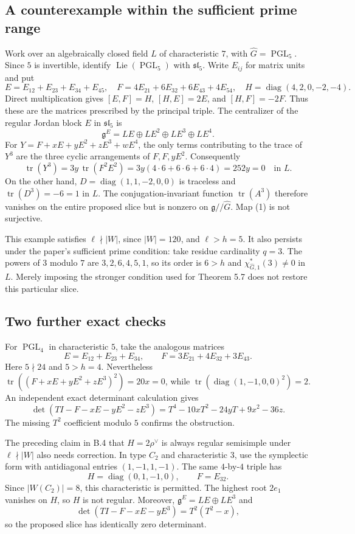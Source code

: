 \documentclass[10pt]{article}
\begin{document}
\subsection*{A counterexample within the sufficient prime range}
Work over an algebraically closed field \(L\) of characteristic \(7\), with \(\widehat G=\operatorname{PGL}_5\). Since \(5\) is invertible, identify \(\operatorname{Lie}(\operatorname{PGL}_5)\) with \(\mathfrak{sl}_5\). Write \(E_{ij}\) for matrix units and put \[E=E_{12}+E_{23}+E_{34}+E_{45},\quad
 F=4E_{21}+6E_{32}+6E_{43}+4E_{54},\quad
 H=\operatorname{diag}(4,2,0,-2,-4).\] Direct multiplication gives \([E,F]=H\), \([H,E]=2E\), and \([H,F]=-2F\). Thus these are the matrices prescribed by the principal triple. The centralizer of the regular Jordan block \(E\) in \(\mathfrak{sl}_5\) is \[\mathfrak g^E=L E\oplus L E^2\oplus L E^3\oplus L E^4 .\] For \(Y=F+xE+yE^2+zE^3+wE^4\), the only terms contributing to the trace of \(Y^3\) are the three cyclic arrangements of \(F,F,yE^2\). Consequently \[\operatorname{tr}(Y^3)=3y\,\operatorname{tr}(F^2E^2)
         =3y(4\cdot6+6\cdot6+6\cdot4)=252y=0\quad\text{in }L.       \tag{2}\] On the other hand, \(D=\operatorname{diag}(1,1,-2,0,0)\) is traceless and \(\operatorname{tr}(D^3)=-6=1\) in \(L\). The conjugation-invariant function \(\operatorname{tr}(A^3)\) therefore vanishes on the entire proposed slice but is nonzero on \(\mathfrak g/\!/\widehat G\). Map (1) is not surjective.\par
This example satisfies \(\ell\nmid |W|\), since \(|W|=120\), and \(\ell>h=5\). It also persists under the paper’s sufficient prime condition: take residue cardinality \(q=3\). The powers of \(3\) modulo \(7\) are \(3,2,6,4,5,1\), so its order is \(6>h\) and \(\chi_{\widehat G,1}^{*}(3)\ne0\) in \(L\). Merely imposing the stronger condition used for Theorem 5.7 does not restore this particular slice.\par
\subsection*{Two further exact checks}
For \(\operatorname{PGL}_4\) in characteristic \(5\), take the analogous matrices \[E=E_{12}+E_{23}+E_{34},\qquad
 F=3E_{21}+4E_{32}+3E_{43}.\] Here \(5\nmid24\) and \(5>h=4\). Nevertheless \(\operatorname{tr}((F+xE+yE^2+zE^3)^2)=20x=0\), while \(\operatorname{tr}(\operatorname{diag}(1,-1,0,0)^2)=2\). An independent exact determinant calculation gives \[\det(TI-F-xE-yE^2-zE^3)
 =T^4-10xT^2-24yT+9x^2-36z.\] The missing \(T^2\) coefficient modulo \(5\) confirms the obstruction.\par
The preceding claim in B.4 that \(H=2\rho^\vee\) is always regular semisimple under \(\ell\nmid|W|\) also needs correction. In type \(C_2\) and characteristic \(3\), use the symplectic form with antidiagonal entries \((1,-1,1,-1)\). The same \(4\)-by-\(4\) triple has \[H=\operatorname{diag}(0,1,-1,0),\qquad F=E_{32}.\] Since \(|W(C_2)|=8\), this characteristic is permitted. The highest root \(2e_1\) vanishes on \(H\), so \(H\) is not regular. Moreover, \(\mathfrak g^E=L E\oplus L E^3\) and \[\det(TI-F-xE-yE^3)=T^2(T^2-x),\] so the proposed slice has identically zero determinant.\par
\end{document}
